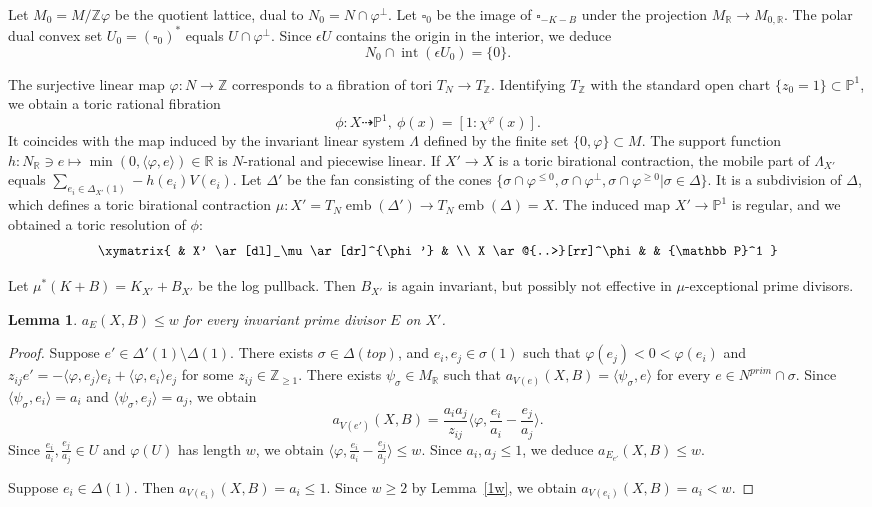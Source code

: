 \documentclass[12pt,twoside]{amsart}
\newcommand{\Z}{{\mathbb Z}}
\newcommand{\R}{{\mathbb R}}
\newcommand{\bP}{{\mathbb P}} %
\newcommand{\emb}{\operatorname{emb}}
\newcommand{\Int}{\operatorname{int}}
\theoremstyle{plain}
\newtheorem{lem}[thm]{Lemma}
\theoremstyle{definition}
\theoremstyle{remark}
\begin{document}
Let $M_0=M/\Z\varphi$ be the quotient lattice, dual to $N_0=N\cap \varphi^\perp$.
Let $\square_0$ be the image of $\square_{-K-B}$ under the projection 
$M_\R\to M_{0,\R}$. The polar dual convex set $U_0=(\square_0)^*$ equals $U\cap \varphi^\perp$.
Since $\epsilon U$ contains the origin in the interior, we deduce
$$
N_0 \cap \Int(\epsilon U_0)=\{0\}.
$$

The surjective linear map $\varphi\colon N\to \Z$ corresponds to a fibration of tori
$T_N\to T_\Z$. Identifying $T_\Z$ with the standard open chart $\{z_0=1\}\subset \bP^1$,
we obtain a toric rational fibration 
$$
\phi \colon X\dashrightarrow  \bP^1, \ \phi (x)=[1:\chi^\varphi(x)].
$$ 
It coincides with the map induced by the invariant linear
system $\Lambda$ defined by the finite set $\{0,\varphi\}\subset M$. The support function
$h\colon N_\R\ni e\mapsto \min(0,\langle \varphi,e \rangle)\in \R$ is $N$-rational
and piecewise linear. If $X'\to X$ is a toric birational contraction, the mobile part 
of $\Lambda_{X'}$ equals $\sum_{e_i\in \Delta_{X'}(1)}-h(e_i)V(e_i)$.
Let $\Delta'$ be the fan consisting of the cones 
$\{ \sigma\cap \varphi^{\le 0},\sigma\cap \varphi^\perp,\sigma\cap \varphi^{\ge 0} | \sigma\in \Delta \}$.
It is a subdivision of $\Delta$, which defines a toric birational contraction 
$\mu\colon X'=T_N\emb(\Delta')\to T_N\emb(\Delta)=X$. The induced map 
$X'\to \bP^1$ is regular, and we obtained a toric resolution of $\phi$:
\[ 
\xymatrix{
	&   X' \ar[dl]_\mu  \ar[dr]^{\phi'} &       \\
	X  \ar@{..>}[rr]^\phi  &   &      \bP^1
}
\]

Let $\mu^*(K+B)=K_{X'}+B_{X'}$ be the log pullback. Then $B_{X'}$ is again invariant,
but possibly not effective in $\mu$-exceptional prime divisors.
 
\begin{lem}\label{bnda}
	$a_E(X,B)\le w$ for every invariant prime divisor $E$ on $X'$.
\end{lem} 

\begin{proof} Suppose $e'\in \Delta'(1)\setminus \Delta(1)$. There exists $\sigma\in \Delta(top)$,
	and $e_i,e_j\in \sigma(1)$ such that $\varphi(e_j)<0<\varphi(e_i)$ and 
	$
	z_{ij}e'=-\langle \varphi,e_j\rangle e_i+ \langle \varphi,e_i \rangle e_j
	$
	for some $z_{ij}\in \Z_{\ge 1}$. There exists $\psi_\sigma\in M_\R$ such that 
	$a_{V(e)}(X,B)=\langle \psi_\sigma,e \rangle$ for every $e\in N^{prim}\cap \sigma$.
	Since $\langle \psi_\sigma,e_i\rangle=a_i$ and $\langle \psi_\sigma,e_j \rangle=a_j$, we obtain 
	$$
	a_{V(e')}(X,B)=\frac{a_ia_j}{z_{ij}}\langle \varphi,\frac{e_i}{a_i}-\frac{e_j}{a_j} \rangle.
	$$
	Since $\frac{e_i}{a_i},\frac{e_j}{a_j}\in U$ and $ \varphi(U)$ has length $w$,
	we obtain $\langle \varphi,\frac{e_i}{a_i}-\frac{e_j}{a_j} \rangle\le w$. Since $a_i,a_j\le 1$,
	we deduce $a_{E_{e'}}(X,B)\le w$.
	
	Suppose $e_i\in \Delta(1)$. Then $a_{V(e_i)}(X,B)=a_i\le 1$. Since $w\ge 2$ by Lemma~\ref{1w},
	we obtain $a_{V(e_i)}(X,B)=a_i<w$. 
\end{proof}
\end{document}
